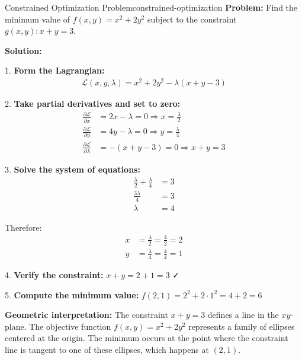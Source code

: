 \documentclass[12pt]{article}
\begin{document}
\begin{example}{Constrained Optimization Problem}{constrained-optimization}
\textbf{Problem:} Find the minimum value of $f(x,y) = x^2 + 2y^2$ subject to the constraint $g(x,y): x + y = 3$.

\textbf{Solution:}

1. \textbf{Form the Lagrangian:}
   \begin{align}
   \mathcal{L}(x, y, \lambda) = x^2 + 2y^2 - \lambda(x + y - 3)
   \end{align}

2. \textbf{Take partial derivatives and set to zero:}
   \begin{align}
   \frac{\partial \mathcal{L}}{\partial x} &= 2x - \lambda = 0 \Rightarrow x = \frac{\lambda}{2} \\
   \frac{\partial \mathcal{L}}{\partial y} &= 4y - \lambda = 0 \Rightarrow y = \frac{\lambda}{4} \\
   \frac{\partial \mathcal{L}}{\partial \lambda} &= -(x + y - 3) = 0 \Rightarrow x + y = 3
   \end{align}

3. \textbf{Solve the system of equations:}
   \begin{align}
   \frac{\lambda}{2} + \frac{\lambda}{4} &= 3 \\
   \frac{3\lambda}{4} &= 3 \\
   \lambda &= 4
   \end{align}
   
   Therefore:
   \begin{align}
   x &= \frac{\lambda}{2} = \frac{4}{2} = 2 \\
   y &= \frac{\lambda}{4} = \frac{4}{4} = 1
   \end{align}

4. \textbf{Verify the constraint:} $x + y = 2 + 1 = 3$ ✓

5. \textbf{Compute the minimum value:} $f(2,1) = 2^2 + 2 \cdot 1^2 = 4 + 2 = 6$

\textbf{Geometric interpretation:} The constraint $x + y = 3$ defines a line in the $xy$-plane. The objective function $f(x,y) = x^2 + 2y^2$ represents a family of ellipses centered at the origin. The minimum occurs at the point where the constraint line is tangent to one of these ellipses, which happens at $(2,1)$.

\begin{center}
\end{center}
\end{example}
\end{document}
